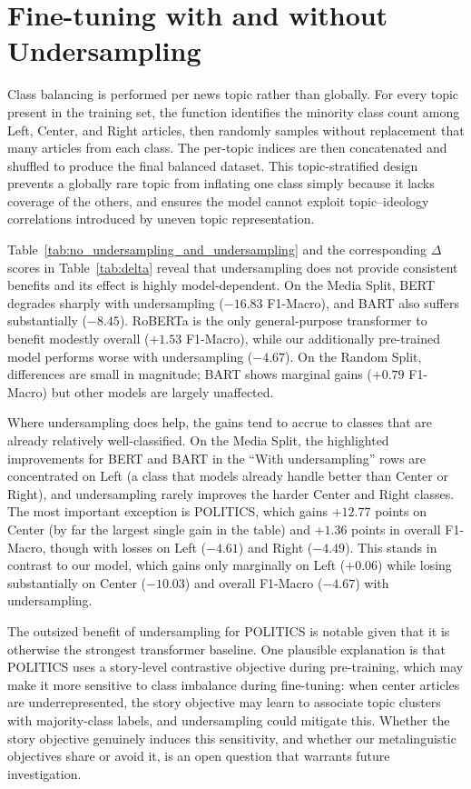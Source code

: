 \chapter{Fine-tuning with and without Undersampling}
\label{appendix:undersampling}

Class balancing is performed per news topic rather than globally. For every topic present in the training set, the function identifies the minority class count among Left, Center, and Right articles, then randomly samples without replacement that many articles from each class. The per-topic indices are then concatenated and shuffled to produce the final balanced dataset. This topic-stratified design prevents a globally rare topic from inflating one class simply because it lacks coverage of the others, and ensures the model cannot exploit topic--ideology correlations introduced by uneven topic representation.

Table~\ref{tab:no_undersampling_and_undersampling} and the corresponding $\Delta$ scores in Table~\ref{tab:delta} reveal that undersampling does not provide consistent benefits and its effect is highly model-dependent. On the Media Split, BERT degrades sharply with undersampling ($-16.83$ F1-Macro), and BART also suffers substantially ($-8.45$). RoBERTa is the only general-purpose transformer to benefit modestly overall ($+1.53$ F1-Macro), while our additionally pre-trained model performs worse with undersampling ($-4.67$). On the Random Split, differences are small in magnitude; BART shows marginal gains ($+0.79$ F1-Macro) but other models are largely unaffected.

Where undersampling does help, the gains tend to accrue to classes that are already relatively well-classified. On the Media Split, the highlighted improvements for BERT and BART in the ``With undersampling'' rows are concentrated on Left (a class that models already handle better than Center or Right), and undersampling rarely improves the harder Center and Right classes. The most important exception is POLITICS, which gains $+12.77$ points on Center (by far the largest single gain in the table) and $+1.36$ points in overall F1-Macro, though with losses on Left ($-4.61$) and Right ($-4.49$). This stands in contrast to our model, which gains only marginally on Left ($+0.06$) while losing substantially on Center ($-10.03$) and overall F1-Macro ($-4.67$) with undersampling.

The outsized benefit of undersampling for POLITICS is notable given that it is otherwise the strongest transformer baseline. One plausible explanation is that POLITICS uses a story-level contrastive objective during pre-training, which may make it more sensitive to class imbalance during fine-tuning: when center articles are underrepresented, the story objective may learn to associate topic clusters with majority-class labels, and undersampling could mitigate this. Whether the story objective genuinely induces this sensitivity, and whether our metalinguistic objectives share or avoid it, is an open question that warrants future investigation.

